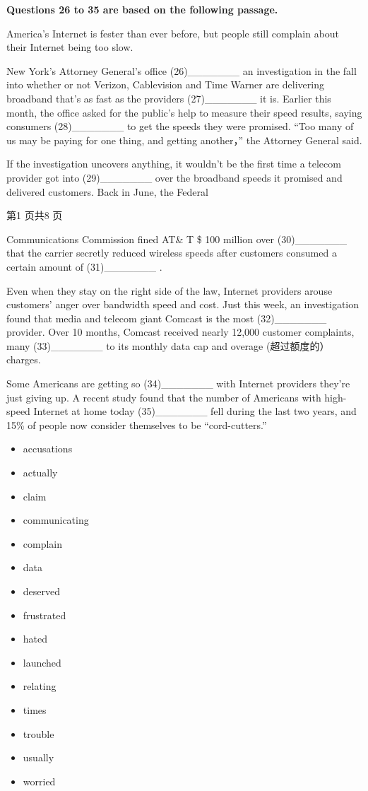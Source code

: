 \documentclass[UTF8,11pt]{ctexart}
\begin{document}
\textbf{Questions 26 to 35 are based on the following passage.}


America’s Internet is fester than ever before, but people still complain about their Internet being too slow.


New York’s Attorney General’s office (26)\_\_\_\_\_\_\_ an investigation in the fall into whether or not Verizon, Cablevision and Time Warner are delivering broadband that’s as fast as the providers (27)\_\_\_\_\_\_\_ it is. Earlier this month, the office asked for the public’s help to measure their speed results, saying consumers (28)\_\_\_\_\_\_\_ to get the speeds they were promised. “Too many of us may be paying for one thing, and getting another，” the Attorney General said.


If the investigation uncovers anything, it wouldn’t be the first time a telecom provider got into (29)\_\_\_\_\_\_\_ over the broadband speeds it promised and delivered customers. Back in June, the Federal


第1 页共8 页


Communications Commission fined AT\& T \$ 100 million over (30)\_\_\_\_\_\_\_ that the carrier secretly reduced wireless speeds after customers consumed a certain amount of (31)\_\_\_\_\_\_\_ .


Even when they stay on the right side of the law, Internet providers arouse customers’ anger over bandwidth speed and cost. Just this week, an investigation found that media and telecom giant Comcast is the most (32)\_\_\_\_\_\_\_ provider. Over 10 months, Comcast received nearly 12,000 customer complaints, many (33)\_\_\_\_\_\_\_ to its monthly data cap and overage (超过额度的）charges.


Some Americans are getting so (34)\_\_\_\_\_\_\_ with Internet providers they’re just giving up. A recent study found that the number of Americans with high-speed Internet at home today (35)\_\_\_\_\_\_\_ fell during the last two years, and 15\% of people now consider themselves to be “cord-cutters.”


\begin{itemize}[leftmargin=2em,itemsep=.2em,topsep=.4em]\item[A.] accusations
\item[B.] actually
\item[C.] claim
\item[D.] communicating
\item[E.] complain
\item[F.] data
\item[G.] deserved
\item[H.] frustrated
\item[I.] hated
\item[J.] launched
\item[K.] relating
\item[L.] times
\item[M.] trouble
\item[N.] usually
\item[O.] worried
\end{itemize}
\end{document}
